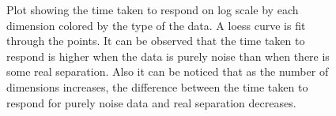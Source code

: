 \documentclass[12]{article}
\begin{document}
\begin{figure}[hbtp]
   \centering
      \caption{Plot showing the time taken to respond on log scale by each dimension colored by the type of the data. A loess curve is fit through the points. It can be observed that the time taken to respond is higher when the data is purely noise than when there is some real separation. Also it can be noticed that as the number of dimensions increases, the difference between the time taken to respond for purely noise data and real separation decreases. }
       \label{time-taken}
\end{figure}

\end{document}
